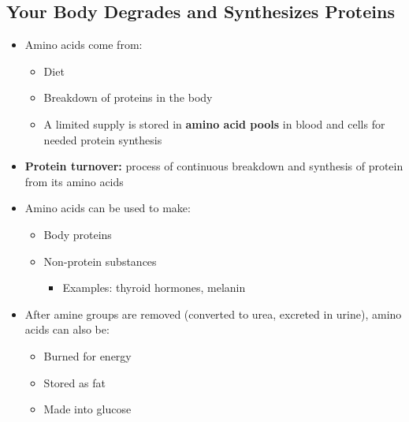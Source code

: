 \documentclass[12pt]{article}
\begin{document}
        \subsection{Your Body Degrades and Synthesizes Proteins}
            \begin{itemize}
                \item Amino acids come from:
                    \begin{itemize}
                        \item Diet
                        \item Breakdown of proteins in the body
                        \item A limited supply is stored in \textbf{amino acid pools} in blood and cells for needed protein synthesis
                    \end{itemize}
                \item \textbf{Protein turnover:} process of continuous breakdown and synthesis of protein from its amino acids
                \item Amino acids can be used to make:
                    \begin{itemize}
                        \item Body proteins
                        \item Non-protein substances
                            \begin{itemize}
                                \item Examples: thyroid hormones, melanin
                            \end{itemize}
                    \end{itemize}
                \item After amine groups are removed (converted to urea, excreted in urine), amino acids can also be:
                    \begin{itemize}
                        \item Burned for energy
                        \item Stored as fat
                        \item Made into glucose
                    \end{itemize}
            \end{itemize}
\end{document}
